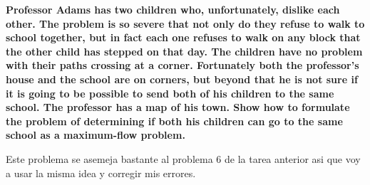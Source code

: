 \textbf{Professor Adams has two children who, unfortunately, dislike each other. The problem is so severe that not only do they refuse to walk to school together, but in fact each one refuses to walk on any block that the other child has stepped on that day. The children have no problem with their paths crossing at a corner. Fortunately both the professor’s house and the school are on corners, but beyond that he is not sure if it is going to be possible to send both of his children to the same school. The professor has a map of his town. Show how to formulate the problem of determining if both his children can go to the same school as a maximum-flow problem.}\vspace{.2cm}

Este problema se asemeja bastante al problema 6 de la tarea anterior asi que voy a usar la misma idea y corregir mis errores. \vspace{.2cm}

